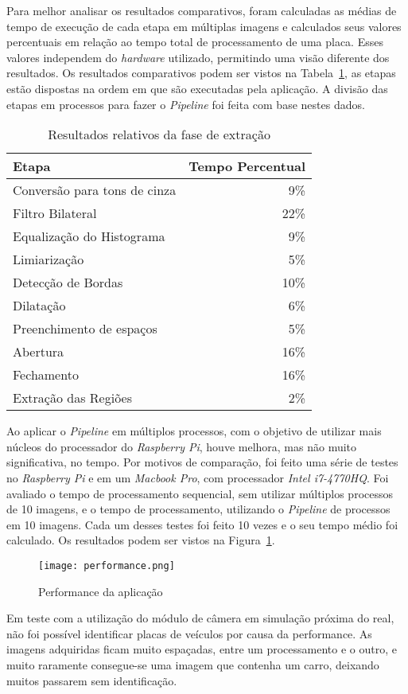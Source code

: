 Para melhor analisar os resultados comparativos, foram calculadas as médias de
tempo de execução de cada etapa em múltiplas imagens e calculados seus valores
percentuais em relação ao tempo total de processamento de uma placa. Esses
valores independem do \emph{hardware} utilizado, permitindo uma visão diferente
dos resultados.  Os resultados comparativos podem ser vistos na
Tabela~\ref{tab:resultados_relativos}, as etapas estão dispostas na ordem em que
são executadas pela aplicação. A divisão das etapas em processos para fazer o
\emph{Pipeline} foi feita com base nestes dados.

\begin{table}[H]
\centering
\caption{Resultados relativos da fase de extração}
\label{tab:resultados_relativos}
\begin{tabular}{@{}lr@{}}
\toprule
Etapa                        & Tempo Percentual \\ \midrule
Conversão para tons de cinza & 9\%             \\
Filtro Bilateral             & 22\%             \\
Equalização do Histograma    & 9\%             \\
Limiarização                 & 5\%             \\
Detecção de Bordas           & 10\%             \\
Dilatação                    & 6\%             \\
Preenchimento de espaços     & 5\%             \\
Abertura                     & 16\%             \\
Fechamento                   & 16\%             \\
Extração das Regiões         & 2\%             \\ \bottomrule
\end{tabular}
\end{table}

Ao aplicar o \emph{Pipeline} em múltiplos processos, com o objetivo de
utilizar mais núcleos do processador do \emph{Raspberry Pi}, houve melhora, mas
não muito significativa, no tempo. Por motivos de comparação, foi feito
uma série de testes no \emph{Raspberry Pi} e em um
\emph{Macbook Pro}, com processador \emph{Intel i7-4770HQ}. Foi avaliado o tempo
de processamento sequencial, sem utilizar múltiplos processos de 10 imagens, e o
tempo de processamento, utilizando o \emph{Pipeline} de processos em 10 imagens.
Cada um desses testes foi feito 10 vezes e o seu tempo médio foi calculado.  Os
resultados podem ser vistos na Figura~\ref{fig:performance}.

\begin{figure}[H]
	\centering
	\texttt{[image: performance.png]}
	\caption{Performance da aplicação}
	\label{fig:performance}
\end{figure}


Em teste com a utilização do módulo de câmera em simulação próxima do real, não foi possível
identificar placas de veículos por causa da performance. As imagens adquiridas ficam muito espaçadas,
entre um processamento e o outro, e muito raramente consegue-se uma imagem que contenha um carro, deixando
muitos passarem sem identificação.

